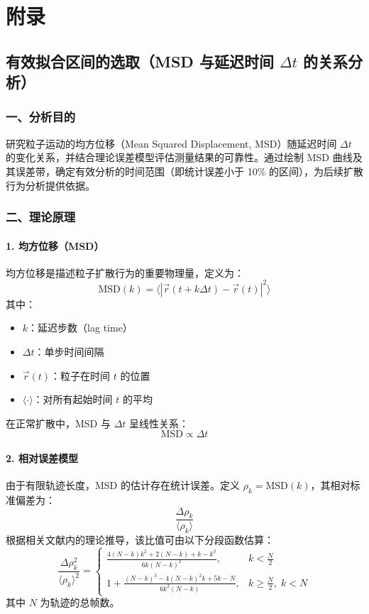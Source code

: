 \documentclass[a4paper]{report} %
\begin{document}
\chapter{附录}
\section{有效拟合区间的选取（MSD 与延迟时间 $\Delta t$ 的关系分析）}
\subsection*{一、分析目的}

研究粒子运动的均方位移（Mean Squared Displacement, MSD）随延迟时间 $\Delta t$ 的变化关系，并结合理论误差模型评估测量结果的可靠性。通过绘制 MSD 曲线及其误差带，确定有效分析的时间范围（即统计误差小于 10\% 的区间），为后续扩散行为分析提供依据。

\subsection*{二、理论原理}
\subsubsection*{1. 均方位移（MSD）}
均方位移是描述粒子扩散行为的重要物理量，定义为：
\[
\text{MSD}(k) = \langle |\vec{r}(t + k\Delta t) - \vec{r}(t)|^2 \rangle
\]
其中：
\begin{itemize}
    \item $k$：延迟步数（lag time）
    \item $\Delta t$：单步时间间隔
    \item $\vec{r}(t)$：粒子在时间 $t$ 的位置
    \item $\langle \cdot \rangle$：对所有起始时间 $t$ 的平均
\end{itemize}
在正常扩散中，MSD 与 $\Delta t$ 呈线性关系：
\[
\text{MSD} \propto \Delta t
\]
\subsubsection*{2. 相对误差模型}
由于有限轨迹长度，MSD 的估计存在统计误差。定义 $\rho_k = \text{MSD}(k)$，其相对标准偏差为：
\[
\frac{\Delta \rho_k}{\langle \rho_k \rangle}
\]
根据相关文献内的理论推导\cite{qian1991spt}，该比值可由以下分段函数估算：
\[
\frac{\Delta \rho_k^2}{\langle \rho_k \rangle^2} =
\begin{cases}
\displaystyle \frac{4(N-k)k^2 + 2(N-k) + k - k^3}{6k(N-k)^2}, & k < \tfrac{N}{2} \\[2ex]
\displaystyle 1 + \frac{(N-k)^3 - 4(N-k)^2 k + 5k - N}{6k^2(N-k)}, & k \geq \tfrac{N}{2},\; k < N
\end{cases}
\]
其中 $N$ 为轨迹的总帧数。
\end{document}

